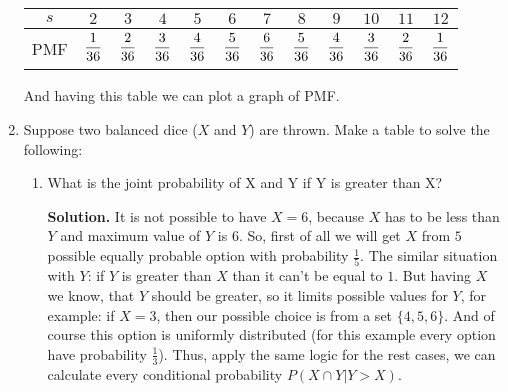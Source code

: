 \documentclass[a4paper, 12pt]{article}
\newcommand{\fract}[2]{\dfrac{\mathstrut #1}{\mathstrut #2}}
\newcommand{\task}[2]{
    \item #1

    \textbf{Solution. } #2
}
\begin{document}
\begin{enumerate}
{              \begin{table}[h]
                  \centering
                  \begin{tabular}{|*{12}{c|}}
                      \hline
                      $s$ & $2$             & $3$             & $4$             & $5$             & $6$             & $7$             & $8$             & $9$             & $10$            & $11$            & $12$            \\
                      \hline
                      PMF & $\fract{1}{36}$ & $\fract{2}{36}$ & $\fract{3}{36}$ & $\fract{4}{36}$ & $\fract{5}{36}$ & $\fract{6}{36}$ & $\fract{5}{36}$ & $\fract{4}{36}$ & $\fract{3}{36}$ & $\fract{2}{36}$ & $\fract{1}{36}$ \\
                      \hline
                  \end{tabular}
              \end{table}

              And having this table we can plot a graph of PMF.
              \begin{center}
              \end{center}
          }
    \item Suppose two balanced dice ($X$ and $Y$) are thrown. Make a table to solve the following:
          \begin{enumerate}
              \task{What is the joint probability of X and Y if Y is greater than X?}
              {
                  It is not possible to have $X=6$, because $X$ has to be less than $Y$ and maximum value of $Y$ is $6$.
                  So, first of all we will get $X$ from $5$ possible equally probable option with probability $\frac{1}{5}$.
                  The similar situation with $Y$: if $Y$ is greater than $X$ than it can't be equal
                  to $1$. But having $X$ we know, that $Y$ should be greater, so
                  it limits possible values for $Y$, for example: if $X=3$, then our possible choice is from a set
                  $\{4, 5, 6\}$. And of course this option is uniformly distributed (for this example
                  every option have probability $\frac{1}{3}$). Thus, apply the same logic for the rest cases,
                  we can calculate every conditional probability $P(X \cap Y | Y > X)$.

}
\end{enumerate}
\end{enumerate}
\end{document}
